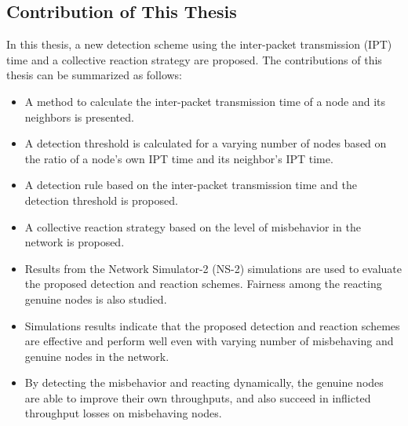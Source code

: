\documentclass[12pt,letterpaper,english]{article}
\begin{document}
\subsection{Contribution of This Thesis}
\indent In this thesis, a new detection scheme using the inter-packet transmission (IPT) time and a collective reaction strategy are proposed. The contributions of this thesis can be summarized as follows:
\begin{itemize}
\item A method to calculate the inter-packet transmission time of a node and its neighbors is presented.
\item A detection threshold is calculated for a varying number of nodes based on the ratio of a node's own IPT time and its neighbor's IPT time. 
\item A detection rule based on the inter-packet transmission time and the detection threshold is proposed.
\item A collective reaction strategy based on the level of misbehavior in the network is proposed.
\item Results from the Network Simulator-2 (NS-2) simulations are used to evaluate the proposed detection and reaction schemes. Fairness among the reacting genuine nodes is also studied.
\item Simulations results indicate that the proposed detection and reaction schemes are effective and perform well even with varying number of misbehaving and genuine nodes in the network.
\item By detecting the misbehavior and reacting dynamically, the genuine nodes are able to improve their own throughputs, and also succeed in inflicted throughput losses on misbehaving nodes.
\end{itemize}
\end{document}
